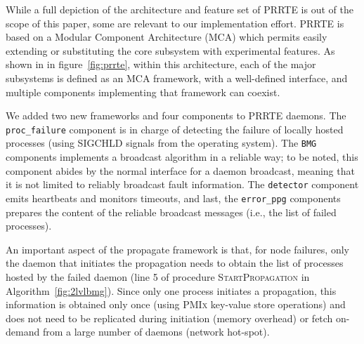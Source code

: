 \documentclass[sigconf]{acmart}
\newcommand{\prrte}[0]{\textsc{PRRTE}\xspace}
\newcommand{\pmix}[0]{\textsc{PMIx}\xspace}
\begin{document}
While a full depiction of the architecture and feature set of \prrte is out of the scope of this paper, some are relevant to our implementation effort. 
\prrte is based on a Modular Component Architecture (MCA) which permits easily extending or substituting the core subsystem with experimental features.
As shown in in figure~\ref{fig:prrte}, within this architecture, each of the major subsystems is defined as an MCA framework, with a well-defined interface, and multiple components implementing that framework can coexist. 

We added two new frameworks and four components to \prrte daemons. The \texttt{proc\_failure}
component is in charge of detecting the failure of locally hosted processes (using 
SIGCHLD signals from the operating system). The \texttt{BMG} components 
implements a broadcast algorithm in a reliable way; to be noted, this component 
abides by the normal interface for a daemon broadcast, meaning that it is not 
limited to reliably broadcast fault information. The \texttt{detector} 
component emits heartbeats and monitors timeouts, and last, the \texttt{error\_ppg}
components prepares the content of the reliable broadcast messages (i.e., the list 
of failed processes).

An important aspect of the propagate framework is that, for node failures, 
only the daemon that initiates the propagation needs to obtain the list of processes 
hosted  by the failed daemon (line 5 of procedure \textsc{StartPropagation} in Algorithm~\ref{fig:2lvlbmg}).
Since only one process initiates a propagation, this information is obtained
 only once (using \pmix key-value store operations) and does not need to 
 be replicated during initiation (memory overhead) or fetch on-demand from 
 a large number of daemons (network hot-spot).
 
\end{document}
